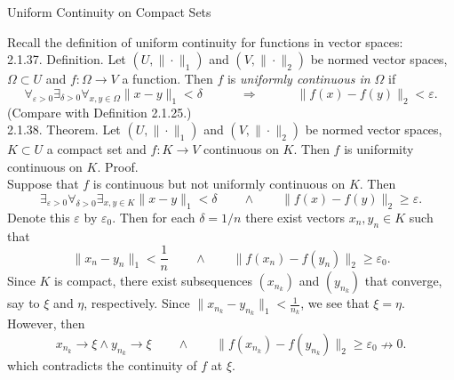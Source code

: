 \documentclass[smaller,hyperref={CJKbookmarks=true}]{beamer}
\begin{document}
\begin{frame}{Uniform Continuity on Compact Sets}
\begin{spacing}{1.1}
Recall the definition of uniform continuity for functions in vector spaces:\\[6pt]
\alert{2.1.37. Definition.} Let $(U,\|\cdot\|_1)$ and $(V,\|\cdot\|_2)$ be normed vector spaces, $\Omega\subset U$ and $f:\Omega\to V$ a function. Then $f$ is \emph{uniformly continuous in $\Omega$} if
\begin{equation}\label{2.1.13}
  \mathop{\forall}_{\varepsilon>0}\mathop{\exists}_{\delta>0}\mathop{\forall}_{x,y\in\Omega}\|x-y\|_1<\delta\qquad
  \quad\Rightarrow\qquad\quad\|f(x)-f(y)\|_2<\varepsilon.
\end{equation}
(Compare with Definition 2.1.25.)\\[3pt]
\alert{2.1.38. Theorem.} Let $(U,\|\cdot\|_1)$ and $(V,\|\cdot\|_2)$ be normed vector spaces, $K\subset U$ a compact set and $f:K\to V$ continuous on $K$. Then $f$ is uniformity continuous on $K$.
\newpage
\alert{Proof.}\\
Suppose that $f$ is continuous but not uniformly continuous on $K$. Then
\[\mathop{\exists}_{\varepsilon>0}\mathop{\forall}_{\delta>0}\mathop{\exists}_{x,y\in K}\|x-y\|_1<\delta\qquad\wedge\qquad\|f(x)-f(y)\|_2\geq\varepsilon.\]
Denote this $\varepsilon$ by $\varepsilon_0$. Then for each $\delta=1/n$ there exist vectors $x_n,y_n\in K$ such that
\[\|x_n-y_n\|_1<\frac{1}{n}\qquad\wedge\qquad\|f(x_n)-f(y_n)\|_2\geq\varepsilon_0.\]
Since $K$ is compact, there exist subsequences $(x_{n_k})$ and $(y_{n_k})$ that converge, say to $\xi$ and $\eta$, respectively. Since $\|x_{n_k}-y_{n_k}\|_1<\frac{1}{n_k}$, we see that $\xi=\eta$. However, then
\[x_{n_k}\to\xi\wedge y_{n_k}\to\xi\qquad\wedge\qquad\|f(x_{n_k})-f(y_{n_k})\|_2\geq\varepsilon_0\nrightarrow0.\]
which contradicts the continuity of $f$ at $\xi$.
\end{spacing}
\end{frame}
\end{document}
